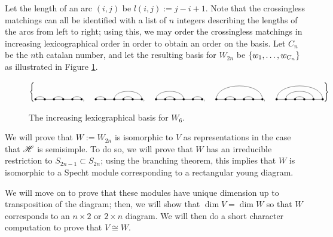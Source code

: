 \documentclass{amsart}
\begin{document}
Let the length of an arc $(i,j)$ be $l(i,j) := j - i + 1$.
Note that the crossingless matchings can all be identified with a list of $n$ integers describing the lengths of the arcs from left to right;
using this, we may order the crossingless matchings in increasing lexicographical order in order to obtain an order on the basis.
Let $C_n$ be the $n$th catalan number, and let the resulting basis for $W_{2n}$ be $\left\{ w_1,\dots,w_{C_n} \right\}$ as illustrated in Figure \ref{S6 Basis}.

\begin{figure}
  \def\cbasisspacing{5mm}
  $\cbr{
    \begin{gathered}
      \Matching{6}{1/2, 3/4, 5/6}, \hspace{\cbasisspacing}
      \Matching{6}{1/2, 3/6, 4/5}, \hspace{\cbasisspacing}
      \Matching{6}{1/4, 2/3, 5/6}, \hspace{\cbasisspacing}
      \Matching{6}{1/6, 2/3, 4/5}, \hspace{\cbasisspacing}
      \Matching{6}{1/6, 2/5, 3/4}
     \end{gathered}}$
    \caption{The increasing lexicgraphical basis for $W_{6}$.}
  \label{S6 Basis}
\end{figure}

We will prove that $W := W_{2n}$ is isomorphic to $V$ as representations in the case that $\mathscr{H}$ is semisimple.
To do so, we will prove that $W$ has an irreducible restriction to $S_{2n-1} \subset S_{2n}$;
using the branching theorem, this implies that $W$ is isomorphic to a Specht module corresponding to a rectangular young diagram.

We will move on to prove that these modules have unique dimension up to transposition of the diagram;
then, we will show that $\dim V = \dim W$ so that $W$ corresponds to an $n \times 2$ or $2 \times n$ diagram.
We will then do a short character computation to prove that $V \cong W$.

\newpage
\end{document}
